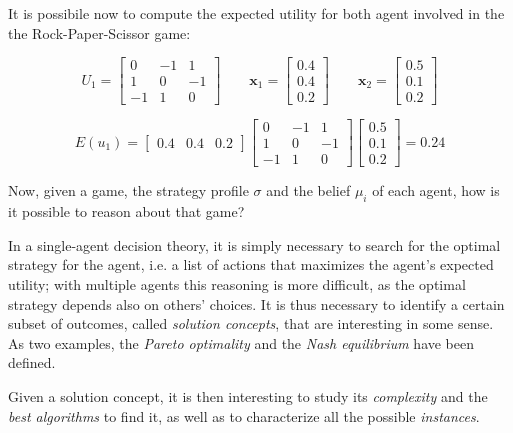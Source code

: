 \begin{Topic}[Introduction]
It is possibile now to compute the expected utility for both agent involved in the the Rock-Paper-Scissor game:

\begin{equation*}
U_1 = \begin{bmatrix}
0 & -1 & 1 \\
1 & 0 & -1 \\
-1 & 1 & 0 
\end{bmatrix} 
\qquad 
\mathbf{x}_1 = \begin{bmatrix}
0.4 \\
0.4 \\
0.2 
\end{bmatrix}
\qquad 
\mathbf{x}_2 = \begin{bmatrix}
0.5 \\
0.1 \\
0.2 
\end{bmatrix}
\end{equation*}

\bigskip
\begin{equation*}
E(u_1) = \begin{bmatrix}
0.4 & 0.4 & 0.2
\end{bmatrix} 
\begin{bmatrix}
0 & -1 & 1 \\
1 & 0 & -1 \\
-1 & 1 & 0 
\end{bmatrix} 
\begin{bmatrix}
0.5 \\
0.1 \\
0.2 
\end{bmatrix} = 0.24
\end{equation*}

Now, given a game, the strategy profile $\sigma$ and the belief $\mu_i$ of each agent, how is it possible to reason about that game? 

In a single-agent decision theory, it is simply necessary to search for the optimal strategy for the agent, i.e. a list of actions that maximizes the agent's expected utility; with multiple agents this reasoning is more difficult, as the optimal strategy depends also on others' choices. It is thus necessary to identify a certain subset of outcomes, called \emph{solution concepts}, that are interesting in some sense. As two examples, the \emph{Pareto optimality} and the \emph{Nash equilibrium} have been defined.

Given a solution concept, it is then interesting to study its \emph{complexity} and the \emph{best algorithms} to find it, as well as to characterize all the possible \emph{instances}.


\end{Topic}
